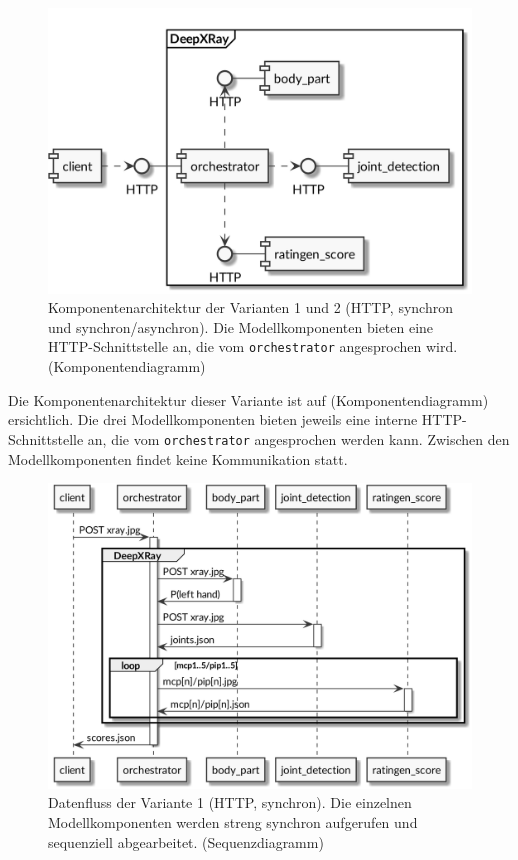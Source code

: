 \begin{figure}[tbh]
    \centering
    \includegraphics[width=\linewidth]{pics/architektur-variante-http.png}
    \caption{Komponentenarchitektur der Varianten 1 und 2 (HTTP, synchron und synchron/asynchron). Die Modellkomponenten bieten eine HTTP-Schnittstelle an, die vom \texttt{orchestrator} angesprochen wird. (Komponentendiagramm)}
    \label{fig:architektur-variante-http}
\end{figure}

Die Komponentenarchitektur dieser Variante ist auf  (Komponentendiagramm) ersichtlich. Die drei Modellkomponenten bieten jeweils eine interne HTTP-Schnittstelle an, die vom \texttt{orchestrator} angesprochen werden kann. Zwischen den Modellkomponenten findet keine Kommunikation statt.

\begin{figure}[tbh]
    \centering
    \includegraphics[width=\linewidth]{pics/datenfluss-variante-http-1.png}
    \caption{Datenfluss der Variante 1 (HTTP, synchron). Die einzelnen Modellkomponenten werden streng synchron aufgerufen und sequenziell abgearbeitet. (Sequenzdiagramm)}
    \label{fig:datenfluss-variante-http-1}
\end{figure}

